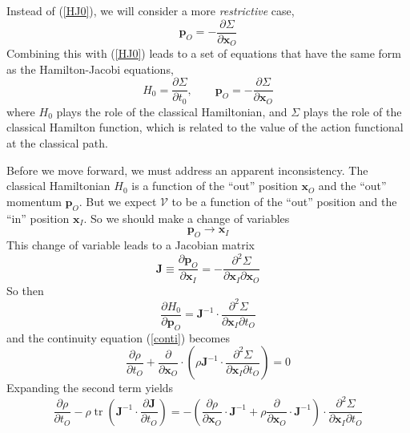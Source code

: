 Instead of (\ref{HJ0}), we will consider a more \textit{restrictive} case,
\begin{equation}
	\mathbf{p}_{O} = - \frac{\partial \Sigma}{\partial \mathbf{x}_{O}}
\end{equation}
Combining this with (\ref{HJ0}) leads to a set of equations that have the same form as the Hamilton-Jacobi equations,
\begin{equation}
	H_{0} = \frac{\partial \Sigma}{\partial t_{0}}, \qquad \mathbf{p}_{O} = - \frac{\partial \Sigma}{\partial \mathbf{x}_{O}}
\end{equation}
where $H_{0}$ plays the role of the classical Hamiltonian, and $\Sigma$ plays the role of the classical Hamilton function, which is related to the value of the action functional at the classical path.

Before we move forward, we must address an apparent inconsistency. The classical Hamiltonian $H_{0}$ is a function of the ``out'' position $\mathbf{x}_{O}$ and the ``out'' momentum $\mathbf{p}_{O}$. But we expect $\mathcal{V}$ to be a function of the ``out'' position and the ``in'' position $\mathbf{x}_{I}$. So we should make a change of variables
\begin{equation}
	\mathbf{p}_{O} \longrightarrow \mathbf{x}_{I}
\end{equation}
This change of variable leads to a Jacobian matrix
\begin{equation}
	\mathbf{J} \equiv \frac{\partial \mathbf{p}_{O}}{\partial \mathbf{x}_{I}} = - \frac{\partial^{2} \Sigma }{\partial \mathbf{x}_{I} \partial \mathbf{x}_{O}}
\end{equation}
So then
\begin{equation}
	\frac{\partial H_{0}}{\partial \mathbf{p}_{O}} = \mathbf{J}^{-1} \cdot \frac{\partial^{2} \Sigma}{\partial \mathbf{x}_{I} \partial t_{O} }
\end{equation}
and the continuity equation (\ref{conti}) becomes
\begin{equation}
	\frac{\partial \rho}{\partial t_{O}} + \frac{\partial}{\partial \mathbf{x}_{O}} \cdot \left( \rho \mathbf{J}^{-1} \cdot \frac{\partial^{2} \Sigma}{\partial \mathbf{x}_{I} \partial t_{O} } \right) = 0
\end{equation}
Expanding the second term yields
\begin{equation}
	\frac{\partial \rho}{\partial t_{O}} - \rho \operatorname{tr}{\left( \mathbf{J}^{-1} \cdot \frac{\partial \mathbf{J}}{\partial t_{O}} \right)} = - \left( \frac{\partial \rho}{\partial \mathbf{x}_{O}} \cdot \mathbf{J}^{-1} + \rho \frac{\partial}{\partial \mathbf{x}_{O}} \cdot \mathbf{J}^{-1} \right) \cdot \frac{\partial^{2} \Sigma}{\partial \mathbf{x}_{I} \partial t_{O} } \label{HJ2}
\end{equation}
